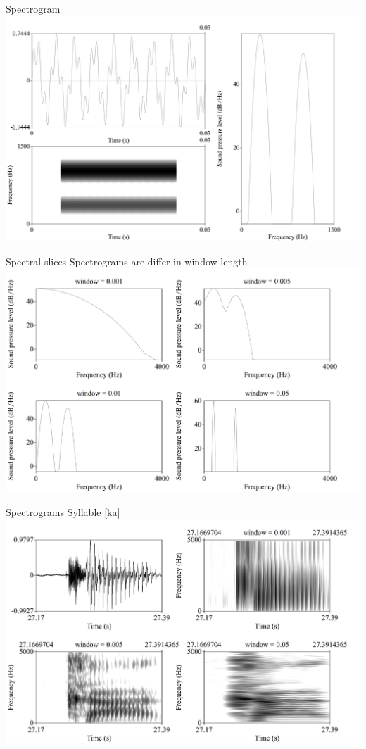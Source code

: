 \begin{frame}{Spectrogram}
\includegraphics[width=\linewidth]{17-fourier-spectrum.png}
\end{frame}

\begin{frame}{Spectral slices}
Spectrograms are differ in window length
\includegraphics[width=\linewidth]{18-fourier-spectrum.png}
\end{frame}

\begin{frame}{Spectrograms}
Syllable [ka]
\includegraphics[width=\linewidth]{19-fourier-spectrum.png}
\end{frame}

